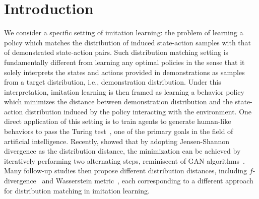 \section{Introduction}

We consider a specific setting of imitation learning:
the problem of learning a policy which matches the distribution of induced state-action samples with that of demonstrated state-action pairs. 
Such distribution matching setting is fundamentally different from learning any optimal policies in the sense that it solely interprets the states and actions provided in demonstrations as samples from a target distribution, i.e., demonstration distribution. 
Under this interpretation, imitation learning is then framed as learning a behavior policy which minimizes the distance between demonstration distribution and the state-action distribution induced by the policy interacting with the environment. 
One direct application of this setting is to train agents to generate human-like behaviors to pass the Turing test~\citep{saygin2000turing}, one of the primary goals in the field of artificial intelligence. 
Recently, \citet{ho2016generative} showed that by adopting Jensen-Shannon divergence as the distribution distance, the minimization can be achieved by iteratively performing two alternating steps, reminiscent of GAN algorithms~\citep{goodfellow2014generative}. 
Many follow-up studies then propose different distribution distances, including $f$-divergence~\citep{ke2019imitation} and Wasserstein metric~\citep{xiao2019wasserstein}, each corresponding to a different approach for distribution matching in imitation learning. 



